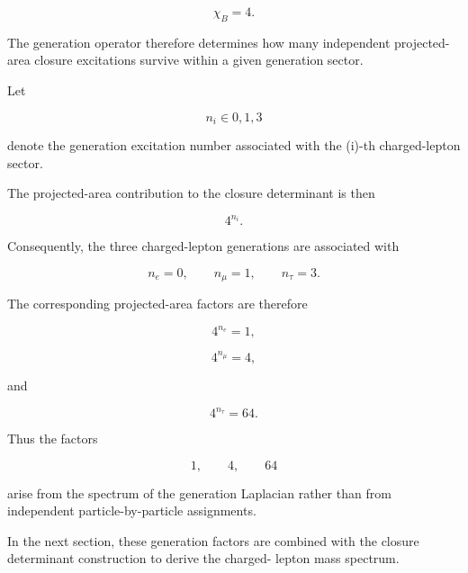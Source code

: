 \documentclass[11pt]{article}
\theoremstyle{definition}
\theoremstyle{remark}
\begin{document}
\begin{equation}
\chi_B = 4.
\end{equation}

The generation operator therefore determines how many
independent projected-area closure excitations survive within a
given generation sector.

Let

\begin{equation}
n_i
\in
{0,1,3}
\end{equation}

denote the generation excitation number associated with the
(i)-th charged-lepton sector.

The projected-area contribution to the closure determinant is
then

\begin{equation}
4^{n_i}.
\label{eq:generation_factor}
\end{equation}

Consequently, the three charged-lepton generations are
associated with

\begin{equation}
n_e = 0,
\qquad
n_\mu =
1,
\qquad
n_\tau = 3.
\label{eq:lepton_generation_numbers}
\end{equation}

The corresponding projected-area factors are therefore

\begin{equation}
4^{n_e} = 1,
\end{equation}

\begin{equation}
4^{n_\mu} = 4,
\end{equation}

and

\begin{equation}
4^{n_\tau} = 64.

\end{equation}

Thus the factors

\begin{equation}
1,
\qquad
4,
\qquad
64
\end{equation}

arise from the spectrum of the generation Laplacian rather than
from independent particle-by-particle assignments.

In the next section, these generation factors are combined with
the closure determinant construction to derive the charged-
lepton mass spectrum.
\end{document}
